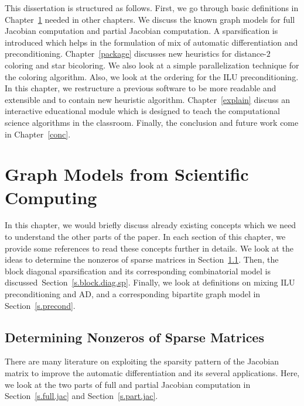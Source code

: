 \documentclass[11pt, twoside,a4paper]{book}
\newcommand{\secref}[1]{Section~\protect\ref{#1}}
\newcommand{\chapref}[1]{Chapter~\protect\ref{#1}}
\begin{document}
This dissertation is structured as follows.
First, we go through basic definitions in \chapref{prel} needed in other chapters.
We discuss the known graph models for full Jacobian computation and partial Jacobian
computation. A sparsification is introduced which helps in the formulation of
mix of automatic differentiation and preconditioning.
\chapref{package} discusses new heuristics for distance-$2$ coloring and
star bicoloring. We also look at a simple parallelization technique for the
coloring algorithm. Also, we look at the ordering for the ILU preconditioning.
In this chapter, we restructure a previous software
to be more readable and extensible and to contain new heuristic algorithm.
\chapref{explain} discuss an interactive educational module
which is designed to teach the computational science algorithms in the classroom.
Finally, the conclusion and future work come in \chapref{conc}.

\chapter{Graph Models from Scientific Computing}
\label{prel}
In this chapter, we would briefly discuss already existing concepts which we need to understand
the other parts of the paper. In each section of this chapter,
we provide some references to read these concepts further in details.
We look at the ideas to determine the nonzeros of sparse matrices in
\secref{s.det.nonzero}. Then, the block diagonal sparsification
and its corresponding combinatorial model is discussed~\secref{s.block.diag.sp}.
Finally, we look at definitions on mixing ILU preconditioning and AD, and
a corresponding bipartite graph model in \secref{s.precond}.

\section{Determining Nonzeros of Sparse Matrices}
\label{s.det.nonzero}
There are many literature on exploiting the sparsity pattern of the Jacobian matrix
to improve the automatic differentiation and its several applications.
Here, we look at the two parts of full and partial Jacobian computation in
\secref{s.full.jac} and \secref{s.part.jac}.
\end{document}
